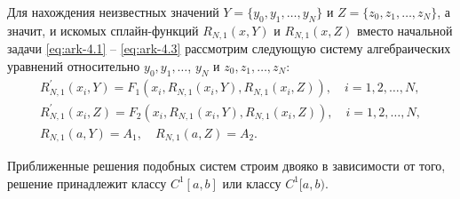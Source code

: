 Для нахождения неизвестных значений $Y=\{y_0,y_1, \dots,y_N\}$ и
$Z=\{z_0,z_1, \dots, z_N\}$, а значит, и искомых сплайн-функций $R_{N,1}(x,Y)$
 и $R_{N,1}(x,Z)$  вместо начальной задачи \eqref{eq:ark-4.1} -- \eqref{eq:ark-4.3}
 рассмотрим следующую систему алгебраических уравнений относительно
 $y_0,y_1, \dots$, $y_N$ и $z_0,z_1, \dots, z_N$:
\begin{gather*}
  R_{N,1}^\prime(x_i,Y)=F_1(x_i, R_{N,1}(x_i,Y),R_{N,1}(x_i,Z)),\quad i=1,2,\dots,N,
  \\
  R_{N,1}^\prime(x_i,Z)=F_2(x_i, R_{N,1}(x_i,Y),R_{N,1}(x_i,Z)),\quad i=1,2,\dots,N,
  \\
  R_{N,1}(a,Y)=A_1,\quad R_{N,1}(a,Z)=A_2.
\end{gather*}

Приближенные решения подобных систем строим двояко в зависимости от того, решение
принадлежит классу $C^1[a,b]$  или классу $C^1[a,b)$.






















